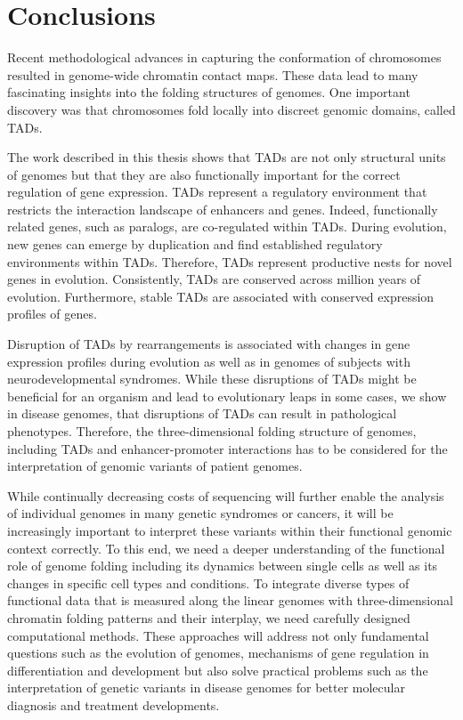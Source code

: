 \documentclass[a4paper,twoside=true,openright,parskip=full,chapterprefix=true,11pt,headings=normal,bibliography=totoc,listof=totoc,titlepage=on,captions=tableabove,draft=false]{scrreprt}
\theoremstyle{definition}
\theoremstyle{definition}
\theoremstyle{definition}
\theoremstyle{remark}
\begin{document}
\hypertarget{conclusions}{%
\section{Conclusions}\label{conclusions}}

Recent methodological advances in capturing the conformation of
chromosomes resulted in genome-wide chromatin contact maps. These data
lead to many fascinating insights into the folding structures of
genomes. One important discovery was that chromosomes fold locally into
discreet genomic domains, called TADs.

The work described in this thesis shows that TADs are not only
structural units of genomes but that they are also functionally
important for the correct regulation of gene expression. TADs represent
a regulatory environment that restricts the interaction landscape of
enhancers and genes. Indeed, functionally related genes, such as
paralogs, are co-regulated within TADs. During evolution, new genes can
emerge by duplication and find established regulatory environments
within TADs. Therefore, TADs represent productive nests for novel genes
in evolution. Consistently, TADs are conserved across million years of
evolution. Furthermore, stable TADs are associated with conserved
expression profiles of genes.

Disruption of TADs by rearrangements is associated with changes in gene
expression profiles during evolution as well as in genomes of subjects
with neurodevelopmental syndromes. While these disruptions of TADs might
be beneficial for an organism and lead to evolutionary leaps in some
cases, we show in disease genomes, that disruptions of TADs can result
in pathological phenotypes. Therefore, the three-dimensional folding
structure of genomes, including TADs and enhancer-promoter interactions
has to be considered for the interpretation of genomic variants of
patient genomes.

While continually decreasing costs of sequencing will further enable the
analysis of individual genomes in many genetic syndromes or cancers, it
will be increasingly important to interpret these variants within their
functional genomic context correctly. To this end, we need a deeper
understanding of the functional role of genome folding including its
dynamics between single cells as well as its changes in specific cell
types and conditions. To integrate diverse types of functional data that
is measured along the linear genomes with three-dimensional chromatin
folding patterns and their interplay, we need carefully designed
computational methods. These approaches will address not only
fundamental questions such as the evolution of genomes, mechanisms of
gene regulation in differentiation and development but also solve
practical problems such as the interpretation of genetic variants in
disease genomes for better molecular diagnosis and treatment
developments.
\end{document}
